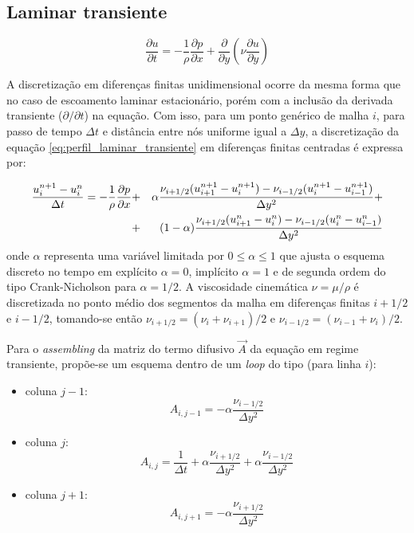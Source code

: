 \subsection{Laminar transiente}

\begin{equation}
	\frac{\partial u}{\partial t}
	=
	- \frac{1}{\rho} \frac{\partial p}{\partial x}
	+ \frac{\partial}{\partial y}\left( \nu \frac{\partial u}{\partial y}\right)
\end{equation}

A discretização em diferenças finitas unidimensional ocorre da mesma forma
que no caso de escoamento laminar estacionário, porém com a inclusão da
derivada transiente ($\partial /\partial t$) na equação. Com isso, para
um ponto genérico de malha $i$, para passo de tempo $\Delta t$ e
distância entre nós uniforme igual a $\Delta y$, a discretização da
equação \ref{eq:perfil_laminar_transiente} em diferenças finitas
centradas é expressa por:

\begin{eqnarray}
  \frac{u_i^{n+1}-u_i^n}{\Delta t} = -\frac{1}{\rho}\frac{\partial p}{\partial x} &+&
  \alpha\frac{\nu_{i+1/2}(u_{i+1}^{n+1}-u_{i}^{n+1})
  -\nu_{i-1/2}(u_{i}^{n+1}-u_{i-1}^{n+1})}{\Delta y^2} +\nonumber\\ &+&
  (1-\alpha)\frac{\nu_{i+1/2}(u_{i+1}^n-u_{i}^n)
  -\nu_{i-1/2}(u_{i}^n-u_{i-1}^n)}{\Delta y^2}
  \label{eq:perfil_turbulento_discr}
\end{eqnarray}
onde $\alpha$ representa uma variável limitada por $0\leq\alpha\leq
1$ que ajusta o esquema discreto no tempo em explícito $\alpha=0$,
implícito $\alpha=1$ e de segunda ordem do tipo Crank-Nicholson para
$\alpha=1/2$. A viscosidade cinemática $\nu = \mu / \rho$ é
discretizada no ponto médio dos segmentos da malha em diferenças finitas
$i+1/2$ e $i-1/2$, tomando-se então $\nu_{i+1/2} =
(\nu_{i}+\nu_{i+1})/2$ e $\nu_{i-1/2} = (\nu_{i-1}+\nu_{i})/2$.

Para o \emph{assembling} da matriz do termo difusivo $\vec{A}$ da
equação em regime transiente, propõe-se um esquema dentro de um \emph{loop} do tipo (para linha $i$):

\begin{itemize}
	\item{coluna $j-1$:}
		\begin{equation}
			A_{i,j-1} = -\alpha \frac{\nu_{i-1/2}}{\Delta y^2}
		\end{equation}
	\item{coluna $j$:}
		\begin{equation}
			A_{i,j} = \frac{1}{\Delta t} 
			+ \alpha \frac{\nu_{i+1/2}}{\Delta y^2}
			+ \alpha \frac{\nu_{i-1/2}}{\Delta y^2}
		\end{equation}
	\item{coluna $j+1$:}
		\begin{equation}
			A_{i,j+1} = -\alpha \frac{\nu_{i+1/2}}{\Delta y^2}
		\end{equation}
\end{itemize}

